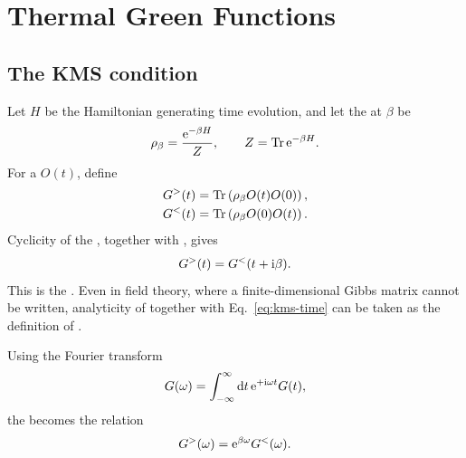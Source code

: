 \chapter{Thermal Green Functions}
\label{chap:thermal-green}

\section{The KMS condition}

Let $H$ be the Hamiltonian generating time evolution, and let the  at  $\beta$ be
\begin{equation}
\rho_\beta
=
\frac{\mathrm{e}^{-\beta H}}{Z},
\qquad
Z
=
\operatorname{Tr}\mathrm{e}^{-\beta H}.
\label{eq:gibbs-state}
\end{equation}
For a  $O(t)$, define
\begin{align}
G^>(t)
&=
\operatorname{Tr}\left(
\rho_\beta O(t)O(0)
\right),
\\
G^<(t)
&=
\operatorname{Tr}\left(
\rho_\beta O(0)O(t)
\right).
\end{align}
Cyclicity of the , together with , gives
\begin{equation}
G^>(t)
=
G^<(t+\mathrm{i}\beta).
\label{eq:kms-time}
\end{equation}
This is the . Even in field theory, where a finite-dimensional Gibbs matrix cannot be written, analyticity of  together with Eq.~\eqref{eq:kms-time} can be taken as the definition of .

Using the Fourier transform
\begin{equation}
G(\omega)
=
\int_{-\infty}^{\infty}\mathrm{d} t\,
\mathrm{e}^{+\mathrm{i}\omega t}G(t),
\label{eq:thermal-fourier}
\end{equation}
the  becomes the  relation
\begin{equation}
G^>(\omega)
=
\mathrm{e}^{\beta\omega}G^<(\omega).
\label{eq:kms-frequency}
\end{equation}

\section{}

